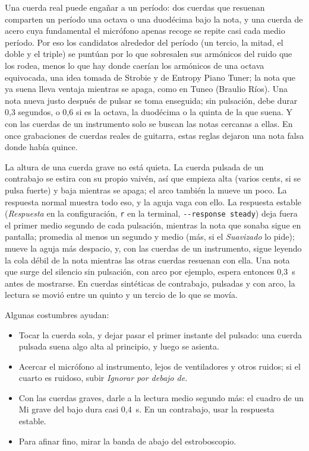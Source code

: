 \documentclass[12pt,
              article,
              oneside
              ]{memoir}
\newcommand*{\menu}[1]{\textit{#1}}
\newcommand*{\key}[1]{\texttt{#1}}
\begin{document}
%
Una cuerda real puede engañar a un período: dos cuerdas que resuenan
comparten un período una octava o una duodécima bajo la nota, y una cuerda
de acero cuya fundamental el micrófono apenas recoge se repite casi cada
medio período. Por eso los candidatos alrededor del período (un tercio, la
mitad, el doble y el triple) se puntúan por lo que sobresalen sus armónicos
del ruido que los rodea, menos lo que hay donde caerían los armónicos de
una octava equivocada, una idea tomada de Strobie y de Entropy Piano Tuner;
la nota que ya suena lleva ventaja mientras se apaga, como en Tuneo
(Braulio Ríos). Una nota nueva justo después de pulsar se toma enseguida;
sin pulsación, debe durar 0,3 segundos, o 0,6 si es la octava, la duodécima
o la quinta de la que suena. Y con las cuerdas de un instrumento solo se
buscan las notas cercanas a ellas. En once grabaciones de cuerdas reales de
guitarra, estas reglas dejaron una nota falsa donde había quince.

%
La altura de una cuerda grave no está quieta. La cuerda pulsada de un
contrabajo se estira con su propio vaivén, así que empieza alta (varios
cents, si se pulsa fuerte) y baja mientras se apaga; el arco también la
mueve un poco. La respuesta normal muestra todo eso, y la aguja vaga con
ello. La respuesta estable (\menu{Respuesta} en la configuración, \key{r}
en la terminal, \texttt{-{}-response steady}) deja fuera el primer medio
segundo de cada pulsación, mientras la nota que sonaba sigue en pantalla;
promedia al menos un segundo y medio (más, si el \menu{Suavizado} lo
pide); mueve la aguja más despacio, y, con las cuerdas de un instrumento,
sigue leyendo la cola débil de la nota mientras las otras cuerdas resuenan
con ella. Una nota que surge del silencio sin pulsación, con arco por
ejemplo, espera entonces 0,3~s antes de mostrarse. En cuerdas sintéticas de
contrabajo, pulsadas y con arco, la lectura se movió entre un quinto y un
tercio de lo que se movía.

%
Algunas costumbres ayudan:

\begin{itemize}
\item Tocar la cuerda sola, y dejar pasar el primer instante del pulsado:
  una cuerda pulsada suena algo alta al principio, y luego se asienta.
\item Acercar el micrófono al instrumento, lejos de ventiladores y otros
  ruidos; si el cuarto es ruidoso, subir \menu{Ignorar por debajo de}.
\item Con las cuerdas graves, darle a la lectura medio segundo más: el
  cuadro de un Mi grave del bajo dura casi 0,4~s. En un contrabajo, usar la
  respuesta estable.
\item Para afinar fino, mirar la banda de abajo del estroboscopio.
\end{itemize}
\end{document}
